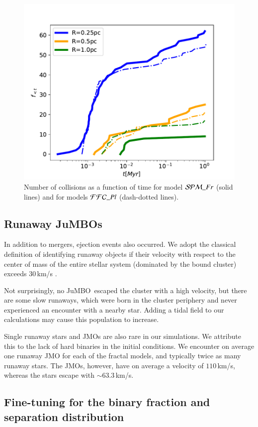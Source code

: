 \documentclass[submission,phys]{lib/SciPost}
\newcommand{\jumbo}{\mbox{JuMBO}}
\newcommand{\jumbos}{\mbox{JuMBOs}}
\begin{document}
\begin{figure}
\centering
    \includegraphics[width=0.75\columnwidth]{figures/fig_collision_evolution_ISF_Fr.pdf
    }
        \caption{Number of collisions as a function of time for model
          ${\cal SPM}\_Fr$ (solid lines) and for models ${\cal
            FFC}\_Pl$ (dash-dotted lines).}
         \label{Fig:collision_evolution_ISF_Fr}
\end{figure}

\subsection{Runaway \jumbos}

In addition to mergers, ejection events also occurred.  We adopt the
classical definition of identifying runaway objects if their velocity
with respect to the center of mass of the entire stellar system
(dominated by the bound cluster) exceeds 30\,km/s
\cite{1961BAN....15..265B}.

Not surprisingly, no \jumbo\, escaped the cluster with a high
velocity, but there are some slow runaways, which were born in the
cluster periphery and never experienced an encounter with a nearby
star. Adding a tidal field to our calculations may cause this
population to increase.

Single runaway stars and JMOs are also rare in our simulations. We
attribute this to the lack of hard binaries in the initial
conditions.  We encounter on average one runaway JMO for each of the
fractal models, and typically twice as many runaway stars.  The JMOs,
however, have on average a velocity of $110$\,km/s, whereas the stars
escape with $\sim 63.3$\,km/s.

\subsection{Fine-tuning for the binary fraction and separation distribution}\label{sect:finetuningbinary_fraction}
\end{document}

